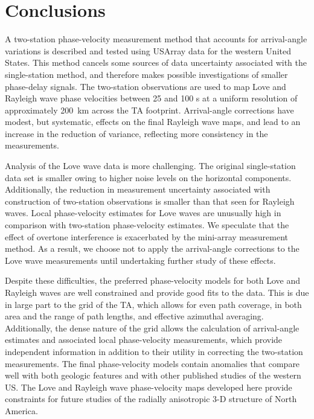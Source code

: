 \documentclass[12pt,oneside]{book}
\begin{document}
\section{Conclusions}
A two-station phase-velocity measurement method that accounts for arrival-angle variations is described and tested using USArray data for the western United States. This method cancels some sources of data uncertainty associated with the single-station method, and therefore makes possible investigations of smaller phase-delay signals. The two-station observations are used to map Love and Rayleigh wave phase velocities between 25 and 100 s at a uniform resolution of approximately 200~km across the TA footprint. Arrival-angle corrections have modest, but systematic, effects on the final Rayleigh wave maps, and lead to an increase in the reduction of variance, reflecting more consistency in the measurements. 

Analysis of the Love wave data is more challenging. The original single-station data set is smaller owing to higher noise levels on the horizontal components. Additionally, the reduction in measurement uncertainty associated with construction of two-station observations is smaller than that seen for Rayleigh waves. Local phase-velocity estimates for Love waves are unusually high in comparison with two-station phase-velocity estimates.  We speculate that the effect of overtone interference is exacerbated by the mini-array measurement method. As a result, we choose not to apply the arrival-angle corrections to the Love wave measurements until undertaking further study of these effects.

Despite these difficulties, the preferred phase-velocity models for both Love and Rayleigh waves are well constrained and provide good fits to the data. This is due in large part to the grid of the TA, which allows for even path coverage, in both area and the range of path lengths, and effective azimuthal averaging. Additionally, the dense nature of the grid allows the calculation of arrival-angle estimates and associated local phase-velocity measurements, which provide independent information in addition to their utility in correcting the two-station measurements. The final phase-velocity models contain anomalies that compare well with both geologic features and with other published studies of the western US. The Love and Rayleigh wave phase-velocity maps developed here provide constraints for future studies of the radially anisotropic 3\nobreakdash-D structure of North America. 
\end{document}
